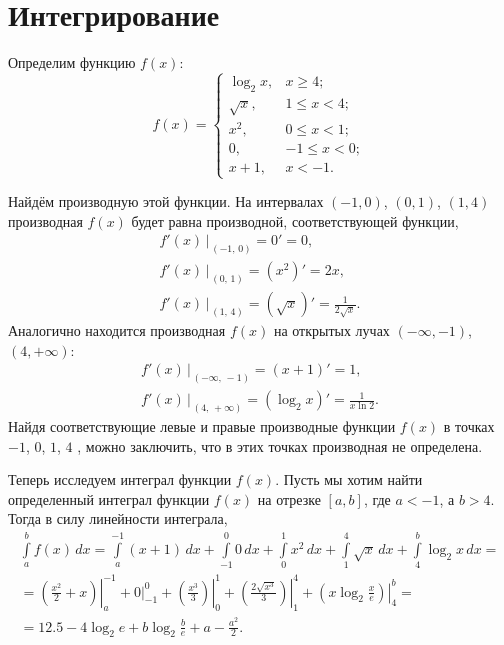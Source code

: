 \documentclass{article}
\begin{document}
    \section{Интегрирование}
    \hspace*{12pt} Определим функцию $f(x)$:
    \begin{equation} 
    	f(x) = \begin{cases} 
    	\log_2 x, & x \geqslant 4;\\
    	\sqrt{x}, & 1 \leqslant x < 4;\\ 
    	x^2, & 0 \leqslant x < 1;\\ 
    	0, & -1 \leqslant x < 0;\\ 
    	x + 1, & x < -1. 
    	\end{cases} 
    \end{equation}\par
    Найдём производную этой функции. На интервалах $(-1, 0)$, $(0, 1)$, $(1, 4)$ производная $f(x)$ будет равна производной, соответствующей функции,
    \begin{gather} 
    f'(x)\,|_{\,(-1,\,0)} = 0' = 0,\\ 
    f'(x)\,|_{\,(0,\,1)} = (x^2)' = 2x,\\ 
    f'(x)\,|_{\,(1,\,4)} = (\sqrt x)' = \frac{1}{2\sqrt{x}}. 
    \end{gather}
    Аналогично находится производная $f(x)$ на открытых лучах $(-\infty, -1)$, $(4, +\infty)$:
    \begin{gather} 
    f'(x)\,|_{\,(-\infty,\,-1)} = (x + 1)' = 1,\\ 
    f'(x)\,|_{\,(4,\,+\infty)} = (\log_2 x)' = \frac{1}{x\ln{2} }. 
    \end{gather}
    Найдя соответствующие левые и правые производные функции $f(x)$ в точках $-1$, $0$, $1$, $4$ , можно заключить, что в этих точках производная не определена.\par
    Теперь исследуем интеграл функции $f(x)$. Пусть мы хотим найти определенный интеграл функции $f(x)$ на отрезке $[a, b]$, где $a < -1$, а $b > 4$. Тогда в силу линейности интеграла,
    \begin{multline} 
    \int\limits_{a}^{b}f(x)\,dx = \int\limits_{a}^{-1}(x+1)\,dx + \int\limits_{-1}^{0} 0\,dx + \int\limits_{0}^{1} x^2\,dx + \int\limits_{1}^{4} \sqrt x\,dx + \int\limits_{4}^{b} \log_2 x\,dx =\\ 
    = \left. \left(\frac{x^2}{2}+x\right) \right|_a^{-1} + \left. 0 \right|_{-1}^0 +\left. \left(\frac{x^3}{3}\right) \right|_0^1 + \left. \left(\frac{2\sqrt{x^3}}{3}\right) \right|_1^4 + \left. \left( x\log_2\frac{x}{e}\right) \right|_4^b = \\ 
    = 12.5 - 4\log_2 e + b\log_2 \frac{b}{e} + a - \frac{a^2}{2}. 
    \end{multline}
\end{document}
